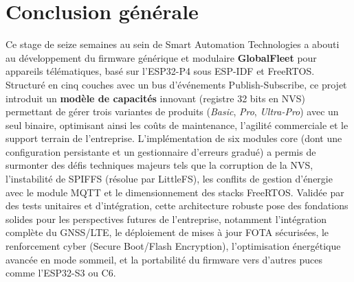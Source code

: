 \chapter*{Conclusion générale}

Ce stage de seize semaines au sein de Smart Automation Technologies a abouti au développement du firmware générique et modulaire \textbf{GlobalFleet} pour appareils télématiques, basé sur l'ESP32-P4 sous ESP-IDF et FreeRTOS. Structuré en cinq couches avec un bus d'événements Publish-Subscribe, ce projet introduit un \textbf{modèle de capacités} innovant (registre 32 bits en NVS) permettant de gérer trois variantes de produits (\textit{Basic}, \textit{Pro}, \textit{Ultra-Pro}) avec un seul binaire, optimisant ainsi les coûts de maintenance, l'agilité commerciale et le support terrain de l'entreprise. L'implémentation de six modules core (dont une configuration persistante et un gestionnaire d'erreurs gradué) a permis de surmonter des défis techniques majeurs tels que la corruption de la NVS, l'instabilité de SPIFFS (résolue par LittleFS), les conflits de gestion d'énergie avec le module MQTT et le dimensionnement des stacks FreeRTOS. Validée par des tests unitaires et d'intégration, cette architecture robuste pose des fondations solides pour les perspectives futures de l'entreprise, notamment l'intégration complète du GNSS/LTE, le déploiement de mises à jour FOTA sécurisées, le renforcement cyber (Secure Boot/Flash Encryption), l'optimisation énergétique avancée en mode sommeil, et la portabilité du firmware vers d'autres puces comme l'ESP32-S3 ou C6.